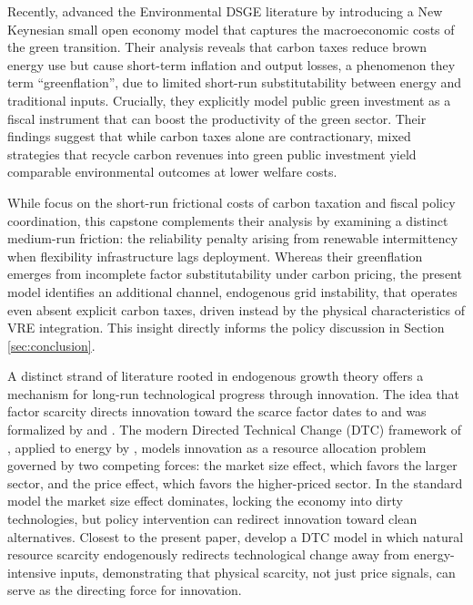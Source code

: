 	Recently, \citet{airaudo2025green} advanced the Environmental DSGE literature by introducing a New Keynesian small open economy model that captures the macroeconomic costs of the green transition. Their analysis reveals that carbon taxes reduce brown energy use but cause short-term inflation and output losses, a phenomenon they term ``greenflation'', due to limited short-run substitutability between energy and traditional inputs. Crucially, they explicitly model public green investment as a fiscal instrument that can boost the productivity of the green sector. Their findings suggest that while carbon taxes alone are contractionary, mixed strategies that recycle carbon revenues into green public investment yield comparable environmental outcomes at lower welfare costs. 
	
	While \citet{airaudo2025green} focus on the short-run frictional costs of carbon taxation and fiscal policy coordination, this capstone complements their analysis by examining a distinct medium-run friction: the reliability penalty arising from renewable intermittency when flexibility infrastructure lags deployment. Whereas their greenflation emerges from incomplete factor substitutability under carbon pricing, the present model identifies an additional channel, endogenous grid instability, that operates even absent explicit carbon taxes, driven instead by the physical characteristics of VRE integration. This insight directly informs the policy discussion in Section \ref{sec:conclusion}.
	
	A distinct strand of literature rooted in endogenous growth theory offers a mechanism for long-run technological progress through innovation. The idea that factor scarcity directs innovation toward the scarce factor dates to \citet{hicks1932} and was formalized by \citet{kennedy1964} and \citet{drandakisphelps1966}. The modern Directed Technical Change (DTC) framework of \citet{acemoglu2002}, applied to energy by \citet{acemoglu2012environment}, models innovation as a resource allocation problem governed by two competing forces: the market size effect, which favors the larger sector, and the price effect, which favors the higher-priced sector. In the standard model the market size effect dominates, locking the economy into dirty technologies, but policy intervention can redirect innovation toward clean alternatives. Closest to the present paper, \citet{hassler2021} develop a DTC model in which natural resource scarcity endogenously redirects technological change away from energy-intensive inputs, demonstrating that physical scarcity, not just price signals, can serve as the directing force for innovation.
	
